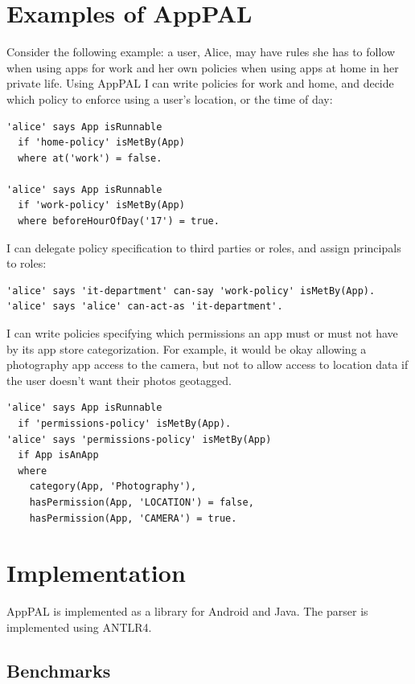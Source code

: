 \documentclass[thesis.tex]{subfiles}
\begin{document}
\section{Examples of AppPAL}

Consider the following example: a user, Alice, may have rules she has to follow
when using apps for work and her own policies when using apps at home in her
private life. Using AppPAL I can write policies for work and home, and decide
which policy to enforce using a user's location, or the time of day:

\begin{lstlisting}
'alice' says App isRunnable
  if 'home-policy' isMetBy(App)
  where at('work') = false.

'alice' says App isRunnable
  if 'work-policy' isMetBy(App)
  where beforeHourOfDay('17') = true.
\end{lstlisting}

I can delegate policy specification to third parties or roles, and assign principals to roles:

\begin{lstlisting}
'alice' says 'it-department' can-say 'work-policy' isMetBy(App).
'alice' says 'alice' can-act-as 'it-department'.
\end{lstlisting}

I can write policies specifying which permissions an app must or must not have
by its app store categorization. For example, it would be okay allowing a
photography app access to the camera, but not to allow access to location data
if the user doesn't want their photos geotagged.

\begin{lstlisting}
'alice' says App isRunnable
  if 'permissions-policy' isMetBy(App).
'alice' says 'permissions-policy' isMetBy(App)
  if App isAnApp
  where
    category(App, 'Photography'),
    hasPermission(App, 'LOCATION') = false,
    hasPermission(App, 'CAMERA') = true.
\end{lstlisting}

\section{Implementation}
\label{sec:implementation}

AppPAL is implemented as a library for Android and Java.
The parser is implemented using ANTLR4.

\subsection{Benchmarks}
\label{ssec:benchmarks}
\end{document}
